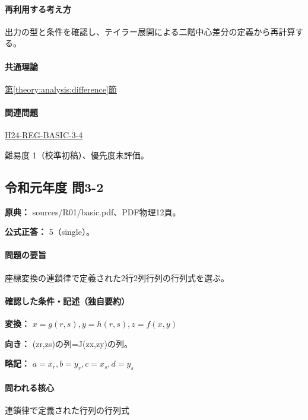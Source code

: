 \paragraph{再利用する考え方} 出力の型と条件を確認し、テイラー展開による二階中心差分の定義から再計算する。

\paragraph{共通理論} \hyperref[theory:analysis:difference]{第\ref*{theory:analysis:difference}節}

\paragraph{関連問題} \hyperref[q:h24-reg-basic-3-4]{H24-REG-BASIC-3-4}

\par 難易度 1（校準初稿）、優先度未評価。

\subsection{令和元年度 問3-2}
\label{q:r01-reg-basic-3-2}

\noindent\textbf{原典：} sources/R01/basic.pdf、PDF物理12頁。

\textbf{公式正答：} 5（single）。

\paragraph{問題の要旨} 座標変換の連鎖律で定義された2行2列行列の行列式を選ぶ。

\paragraph{確認した条件・記述（独自要約）}\mbox{}\par

\noindent\textbf{変換：} \(x=g(r,s),y=h(r,s),z=f(x,y)\)\par

\noindent\textbf{向き：} (zr,zs)の列=J(zx,zy)の列。\par

\noindent\textbf{略記：} \(a=x_r,b=y_r,c=x_s,d=y_s\)\par

\paragraph{問われる核心} 連鎖律で定義された行列の行列式

